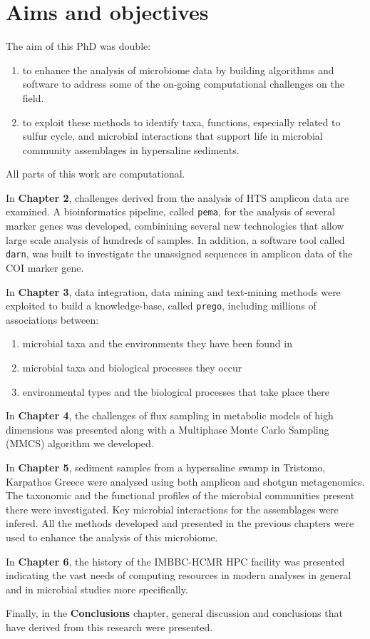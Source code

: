 \section{Aims and objectives}

The aim of this PhD was double:
\begin{enumerate}
   \item to enhance the analysis of microbiome data by building algorithms and software to address some of the on-going computational challenges on the field.
   \item to exploit these methods to identify taxa, functions, especially related to sulfur cycle, and microbial interactions that support life in microbial community assemblages in hypersaline sediments.
\end{enumerate}
All parts of this work are computational. 

In \textbf{Chapter 2}, challenges derived from the analysis of HTS amplicon data are examined.
A bioinformatics pipeline, called \texttt{pema}, for the analysis of several marker genes was developed, combinining several new technologies that allow large scale analysis of hundreds of samples. 
In addition, a software tool called \texttt{darn}, was built to investigate the unassigned sequences in amplicon data of the COI marker gene. 

In \textbf{Chapter 3}, data integration, data mining and text-mining methods were exploited to build a knowledge-base, called \texttt{prego}, including millions of associations between:
\begin{enumerate}
   \item microbial taxa and the environments they have been found in 
   \item microbial taxa and biological processes they occur
   \item environmental types and the biological processes that take place there
\end{enumerate}

In \textbf{Chapter 4}, the challenges of flux sampling in metabolic models of high dimensions was presented along with a Multiphase Monte Carlo Sampling (MMCS) algorithm we developed. 

In \textbf{Chapter 5}, sediment samples from a hypersaline swamp in Tristomo, Karpathos Greece were analysed using both amplicon and shotgun metagenomics. 
The taxonomic and the functional profiles of the microbial communities present there were investigated. 
Key microbial interactions for the assemblages were infered. 
All the methods developed and presented in the previous chapters were used to enhance the analysis of this microbiome.

In \textbf{Chapter 6}, the history of the IMBBC-HCMR HPC facility was presented indicating the vast needs of computing resources in modern analyses in general and in microbial studies more specifically. 


Finally, in the \textbf{Conclusions} chapter, general discussion and conclusions that have derived from this research were presented. 

